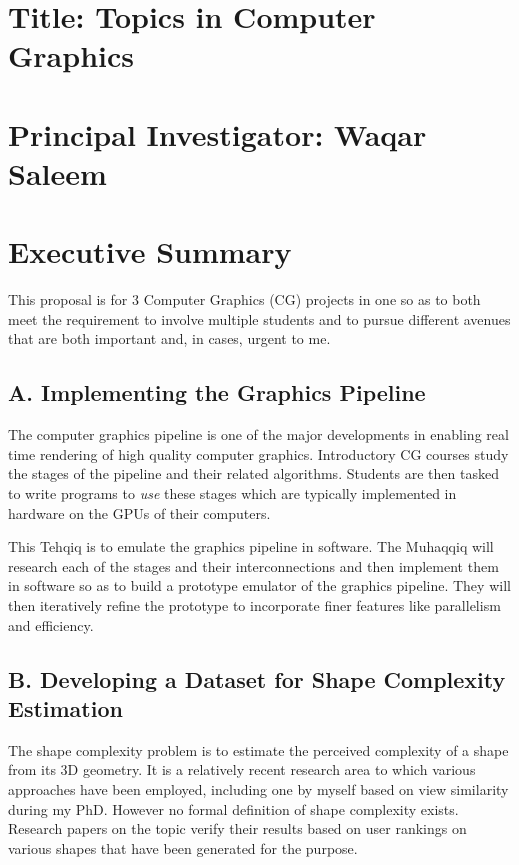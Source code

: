 \documentclass{article}
\begin{document}
\section*{Title: Topics in Computer Graphics}
\section*{Principal Investigator: Waqar Saleem}

\section{Executive Summary}



This proposal is for 3 Computer Graphics (CG) projects in one so as to both meet the requirement to involve multiple students and to pursue different avenues that are both important and, in cases, urgent to me.

\subsection*{A. Implementing the Graphics Pipeline}

The computer graphics pipeline is one of the major developments in enabling real time rendering of high quality computer graphics. Introductory CG courses study the stages of the pipeline and their related algorithms. Students are then tasked to write programs to \textit{use} these stages which are typically implemented in hardware on the GPUs of their computers.

This Tehqiq is to emulate the graphics pipeline in software. The Muhaqqiq will research each of the stages and their interconnections and then implement them in software so as to build a prototype emulator of the graphics pipeline. They will then iteratively refine the prototype to incorporate finer features like parallelism and efficiency.


\subsection*{B. Developing a Dataset for Shape Complexity Estimation}
The shape complexity problem is to estimate the perceived complexity of a shape from its 3D geometry. It is a relatively recent research area to which various approaches have been employed, including one by myself based on view similarity during my PhD. However no formal definition of shape complexity exists. Research papers on the topic verify their results based on user rankings on various shapes that have been generated for the purpose.
\end{document}
